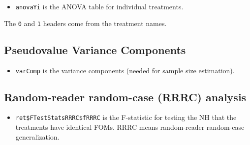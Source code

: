 \documentclass[
]{book}
\newenvironment{Shaded}{\begin{snugshade}}{\end{snugshade}}
\newcommand{\CommentTok}[1]{\textcolor[rgb]{0.56,0.35,0.01}{\textit{#1}}}
\newcommand{\NormalTok}[1]{#1}
\newcommand{\OperatorTok}[1]{\textcolor[rgb]{0.81,0.36,0.00}{\textbf{#1}}}
\providecommand{\tightlist}{%
  \setlength{\itemsep}{0pt}\setlength{\parskip}{0pt}}
\begin{document}
\begin{itemize}
\tightlist
\item
  \texttt{anovaYi} is the ANOVA table for individual treatments.
\end{itemize}

\begin{Shaded}
\end{Shaded}

The \texttt{0} and \texttt{1} headers come from the treatment names.

\hypertarget{pseudovalue-variance-components}{%
\subsection{Pseudovalue Variance Components}\label{pseudovalue-variance-components}}

\begin{itemize}
\tightlist
\item
  \texttt{varComp} is the variance components (needed for sample size estimation).
\end{itemize}

\begin{Shaded}
\end{Shaded}

\hypertarget{random-reader-random-case-rrrc-analysis}{%
\subsection{Random-reader random-case (RRRC) analysis}\label{random-reader-random-case-rrrc-analysis}}

\begin{itemize}
\tightlist
\item
  \texttt{ret\$FTestStatsRRRC\$fRRRC} is the F-statistic for testing the NH that the
  treatments have identical FOMs. RRRC means random-reader random-case generalization.
\end{itemize}
\end{document}
